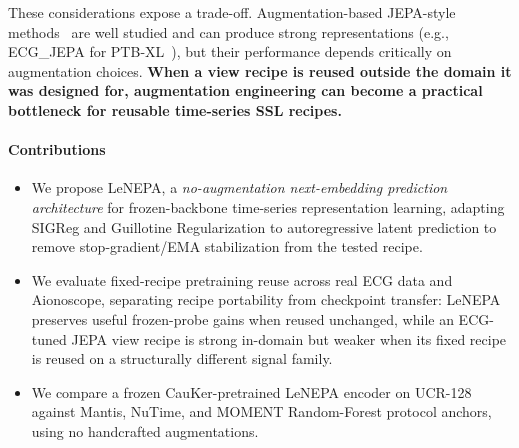 \documentclass[sigconf,anonymous,review]{acmart}
\begin{document}
These considerations expose a trade-off.
Augmentation-based JEPA-style methods~\citep{assran2023ijepa} are well studied and can produce strong representations (e.g., ECG\_JEPA for PTB-XL~\citep{weimann2024jepaecg}), but their performance depends critically on augmentation choices.
\textbf{When a view recipe is reused outside the domain it was designed for, augmentation engineering can become a practical bottleneck for reusable time-series SSL recipes.}

\paragraph{Contributions}
\begin{itemize}
  \item We propose LeNEPA, a \emph{no-augmentation next-embedding prediction architecture} for frozen-backbone time-series representation learning, adapting SIGReg and Guillotine Regularization to autoregressive latent prediction to remove stop-gradient/EMA stabilization from the tested recipe.

  \item We evaluate fixed-recipe pretraining reuse across real ECG data and Aionoscope, separating recipe portability from checkpoint transfer: LeNEPA preserves useful frozen-probe gains when reused unchanged, while an ECG-tuned JEPA view recipe is strong in-domain but weaker when its fixed recipe is reused on a structurally different signal family.

  \item We compare a frozen CauKer-pretrained LeNEPA encoder on UCR-128 against Mantis, NuTime, and MOMENT Random-Forest protocol anchors, using no handcrafted augmentations.
\end{itemize}
\end{document}

